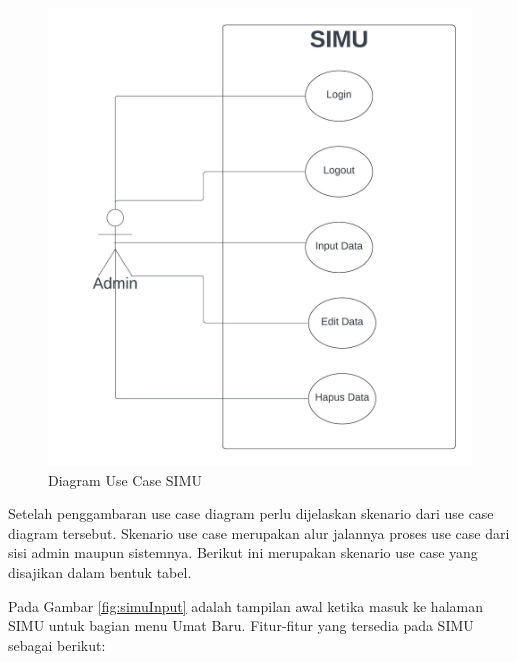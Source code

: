 \begin{figure}[H]
	\centering
	\includegraphics[scale=0.7]{Gambar/usecaseAdmin.jpeg}
	\caption{Diagram Use Case SIMU} 
	\label{fig:usecaseAdmin}
\end{figure}

Setelah penggambaran use case diagram perlu dijelaskan skenario dari use case diagram tersebut. Skenario use case merupakan alur jalannya proses use case dari sisi admin maupun sistemnya. Berikut ini merupakan skenario use case yang disajikan dalam bentuk tabel.

Pada Gambar \ref{fig:simuInput} adalah tampilan awal ketika masuk ke halaman SIMU untuk bagian menu Umat Baru. Fitur-fitur yang tersedia pada SIMU sebagai berikut:


